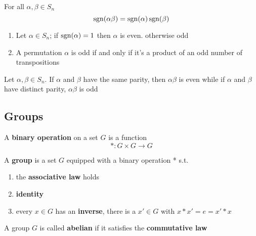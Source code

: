 \documentclass[11pt]{article}
\begin{document}
\begin{theorem}[]
For all \(\alpha,\beta\in S_n\)
\begin{equation*}
\operatorname{sgn}(\alpha\beta)=\operatorname{sgn}(\alpha)\operatorname{sgn}(\beta)
\end{equation*}
\end{theorem}

\begin{theorem}[]
\begin{enumerate}
\item Let \(\alpha\in S_n\); if \(\operatorname{sgn}(\alpha)=1\) then \(\alpha\) is even. otherwise
odd
\item A permutation \(\alpha\) is odd if and only if it's a product of an odd
number of transpositions
\end{enumerate}
\end{theorem}

\begin{corollary}[]
Let \(\alpha,\beta\in S_n\). If \(\alpha\) and \(\beta\) have the same parity, then
\(\alpha\beta\) is even while if \(\alpha\) and \(\beta\) have distinct parity,
\(\alpha\beta\) is odd
\end{corollary}
\subsection{Groups}
\label{sec:orgc5b7100}
\begin{definition}[]
A \textbf{binary operation} on a set \(G\) is a function
\begin{equation*}
*:G\times G\to G
\end{equation*}
\end{definition}

\begin{definition}[]
A \textbf{group} is a set \(G\) equipped with a binary operation * s.t.
\begin{enumerate}
\item the \textbf{associative law} holds
\item \textbf{identity}
\item every \(x\in G\) has an \textbf{inverse}, there is a \(x'\in G\)  with 
\(x*x'=e=x'*x\)
\end{enumerate}
\end{definition}

\begin{definition}[]
A group \(G\) is called \textbf{abelian} if it satisfies the
\textbf{commutative law}
\end{definition}
\end{document}
